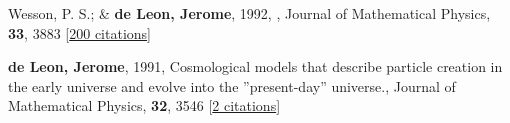 \item[{\color{numcolor}\scriptsize2}] Wesson, P. S.; \& \textbf{de Leon, Jerome}, 1992, , Journal of Mathematical Physics, \textbf{33}, 3883 [\href{https://ui.adsabs.harvard.edu/abs/1992JMP....33.3883W}{200 citations}]

\item[{\color{numcolor}\scriptsize1}] \textbf{de Leon, Jerome}, 1991, Cosmological models that describe particle creation in the early universe and evolve into the ''present-day'' universe., Journal of Mathematical Physics, \textbf{32}, 3546 [\href{https://ui.adsabs.harvard.edu/abs/1991JMP....32.3546D}{2 citations}]